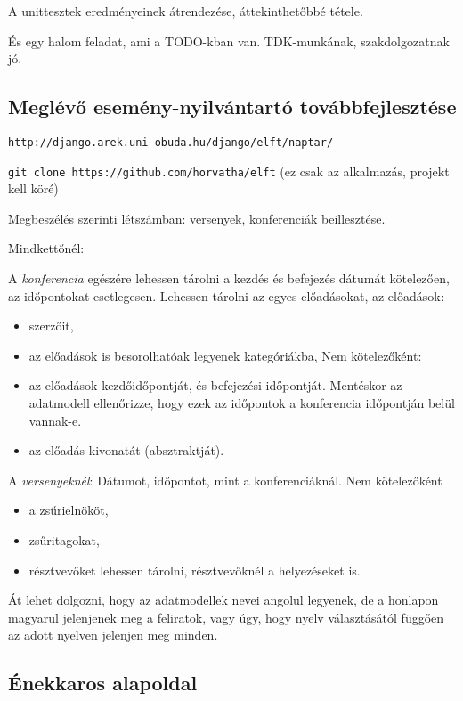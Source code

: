 \documentclass[a4paper]{article}
\begin{document}
A unittesztek eredményeinek átrendezése, áttekinthetőbbé tétele.

És egy halom feladat, ami a TODO-kban van. TDK-munkának, szakdolgozatnak
jó.

\subsection{Meglévő esemény-nyilvántartó továbbfejlesztése}

\verb!http://django.arek.uni-obuda.hu/django/elft/naptar/!

\verb!git clone https://github.com/horvatha/elft!
(ez csak az alkalmazás, projekt kell köré)

Megbeszélés szerinti létszámban: versenyek, konferenciák beillesztése.

Mindkettőnél:

A \emph{konferencia} egészére lehessen tárolni a kezdés és befejezés dátumát
kötelezően, az időpontokat esetlegesen.
Lehessen tárolni az egyes előadásokat,
az előadások:
\begin{itemize}
    \item szerzőit,
    \item az előadások is besorolhatóak legyenek kategóriákba,
	Nem kötelezőként:
    \item az előadások kezdőidőpontját, és befejezési
	időpontját. Mentéskor az adatmodell ellenőrizze, hogy ezek az időpontok
	a konferencia időpontján belül vannak-e.
    \item az előadás kivonatát (absztraktját).
\end{itemize}

A \emph{versenyeknél}:
Dátumot, időpontot, mint a konferenciáknál.
Nem kötelezőként
\begin{itemize}
    \item a zsűrielnököt,
    \item zsűritagokat,
    \item résztvevőket lehessen tárolni, résztvevőknél a helyezéseket is.
\end{itemize}

Át lehet dolgozni, hogy az adatmodellek nevei angolul legyenek, de a
honlapon magyarul jelenjenek meg a feliratok, vagy úgy, hogy nyelv
választásától függően az adott nyelven jelenjen meg minden.

\subsection{Énekkaros alapoldal}
\end{document}
